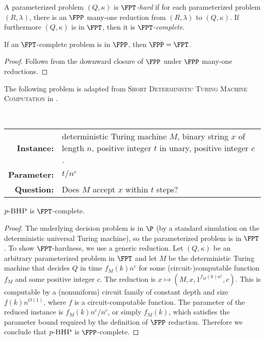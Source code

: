 \documentclass{article}
\newcommand{\dash}{\textnormal{-}}
\newcommand{\pBHP}{p \dash \textsc{BHP}}
\begin{document}
\begin{definition}
  A parameterized problem $(Q, \kappa)$ is \emph{$\FPT$-hard} if for each parameterized problem $(R, \lambda)$, there is an $\FPP$ many-one reduction from $(R, \lambda)$ to $(Q, \kappa)$.
  If furthermore $(Q, \kappa)$ is in $\FPT$, then it is \emph{$\FPT$-complete}.
\end{definition}

\begin{proposition}
  If an $\FPT$-complete problem is in $\FPP$, then $\FPP = \FPT$.
\end{proposition}
\begin{proof}
  Follows from the downward closure of $\FPP$ under $\FPP$ many-one reductions.
\end{proof}

The following problem is adapted from \textsc{Short Deterministic Turing Machine Computation} in \autocite{cesati06}.

\begin{definition}[$p \dash \textsc{Bounded Halting Problem}$, aka $\pBHP$]
  \mbox{} \\
  \begin{tabular}{r p{9.2cm}}
    \textbf{Instance:} & deterministic Turing machine $M$, binary string $x$ of length $n$, positive integer $t$ in unary, positive integer $c$. \\
    \textbf{Parameter:} & $t / n^c$ \\
    \textbf{Question:} & Does $M$ accept $x$ within $t$ steps?
  \end{tabular}
\end{definition}

\begin{theorem}
  $\pBHP$ is $\FPT$-complete.
\end{theorem}
\begin{proof}
  The underlying decision problem is in $\P$ (by a standard simulation on the deterministic universal Turing machine), so the parameterized problem is in $\FPT$.
  To show $\FPT$-hardness, we use a generic reduction.
  Let $(Q, \kappa)$ be an arbitrary parameterized problem in $\FPT$ and let $M$ be the deterministic Turing machine that decides $Q$ in time $f_M(k) n^c$ for some (circuit-)computable function $f_M$ and some positive integer $c$.
  The reduction is $x \mapsto (M, x, 1^{f_M(k) n^c}, c)$.
  This is computable by a (nonuniform) circuit family of constant depth and size $f(k) n^{O(1)}$, where $f$ is a circuit-computable function.
  The parameter of the reduced instance is $f_M(k) n^c / n^c$, or simply $f_M(k)$, which satisfies the parameter bound required by the definition of $\FPP$ reduction.
  Therefore we conclude that $\pBHP$ is $\FPP$-complete.
\end{proof}
\end{document}
